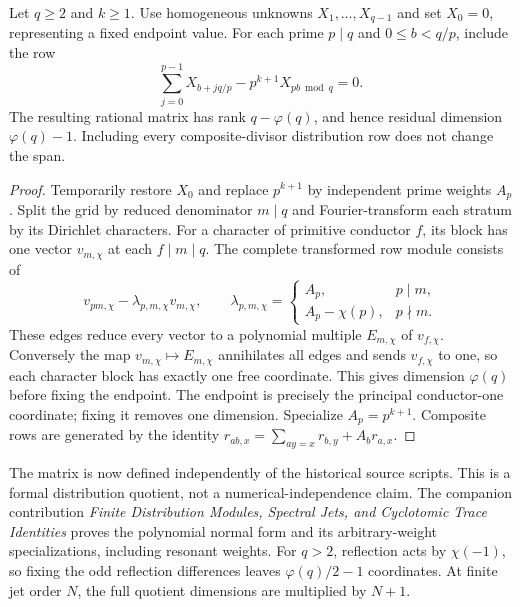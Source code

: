 \begin{theorem}\label{tower:thm:rank}
Let $q\ge2$ and $k\ge1$. Use homogeneous unknowns $X_1,\ldots,X_{q-1}$
and set $X_0=0$, representing a fixed endpoint value. For each prime
$p\mid q$ and $0\le b<q/p$, include the row
\[
 \sum_{j=0}^{p-1}X_{b+jq/p}-p^{k+1}X_{pb\bmod q}=0.
\]
The resulting rational matrix has rank $q-\varphi(q)$, and hence
residual dimension $\varphi(q)-1$. Including every composite-divisor
distribution row does not change the span.
\end{theorem}
\begin{proof}
Temporarily restore $X_0$ and replace $p^{k+1}$ by independent prime
weights $A_p$. Split the grid by reduced denominator $m\mid q$ and
Fourier-transform each stratum by its Dirichlet characters.
For a character of primitive conductor $f$, its block has one vector
$v_{m,\chi}$ at each $f\mid m\mid q$. The complete transformed row
module consists of
\[
 v_{pm,\chi}-\lambda_{p,m,\chi}v_{m,\chi},\qquad
 \lambda_{p,m,\chi}=
 \begin{cases}A_p,&p\mid m,\\ A_p-\chi(p),&p\nmid m.\end{cases}
\]
These edges reduce every vector to a polynomial multiple $E_{m,\chi}$
of $v_{f,\chi}$. Conversely the map $v_{m,\chi}\mapsto E_{m,\chi}$
annihilates all edges and sends $v_{f,\chi}$ to one, so each character
block has exactly one free coordinate. This gives dimension
$\varphi(q)$ before fixing the endpoint. The endpoint is precisely the
principal conductor-one coordinate; fixing it removes one dimension.
Specialize $A_p=p^{k+1}$. Composite rows are generated by the identity
$r_{ab,x}=\sum_{ay=x}r_{b,y}+A_b r_{a,x}$.
\end{proof}

The matrix is now defined independently of the historical source scripts.
This is a formal distribution quotient, not a numerical-independence
claim. The companion contribution \emph{Finite Distribution Modules,
Spectral Jets, and Cyclotomic Trace Identities} proves the polynomial
normal form and its arbitrary-weight specializations, including resonant
weights. For $q>2$, reflection acts by $\chi(-1)$, so fixing the odd
reflection differences leaves $\varphi(q)/2-1$ coordinates. At finite jet
order $N$, the full quotient dimensions are multiplied by $N+1$.
